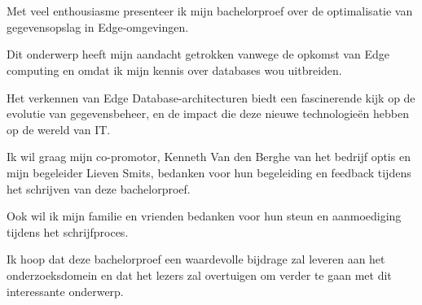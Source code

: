 
\chapter*{}%
\label{ch:voorwoord}


Met veel enthousiasme presenteer ik mijn bachelorproef over de optimalisatie van gegevensopslag in Edge-omgevingen.

Dit onderwerp heeft mijn aandacht getrokken vanwege de opkomst van Edge computing en omdat ik mijn kennis over databases wou uitbreiden.

Het verkennen van Edge Database-architecturen biedt een fascinerende kijk op de evolutie van gegevensbeheer, en de impact die deze nieuwe technologieën hebben op de wereld van IT.

Ik wil graag mijn co-promotor, Kenneth Van den Berghe van het bedrijf optis en mijn begeleider Lieven Smits, bedanken voor hun begeleiding en feedback tijdens het schrijven van deze bachelorproef.

Ook wil ik mijn familie en vrienden bedanken voor hun steun en aanmoediging tijdens het schrijfproces.

Ik hoop dat deze bachelorproef een waardevolle bijdrage zal leveren aan het onderzoeksdomein en dat het lezers zal overtuigen om verder te gaan met dit interessante onderwerp.
